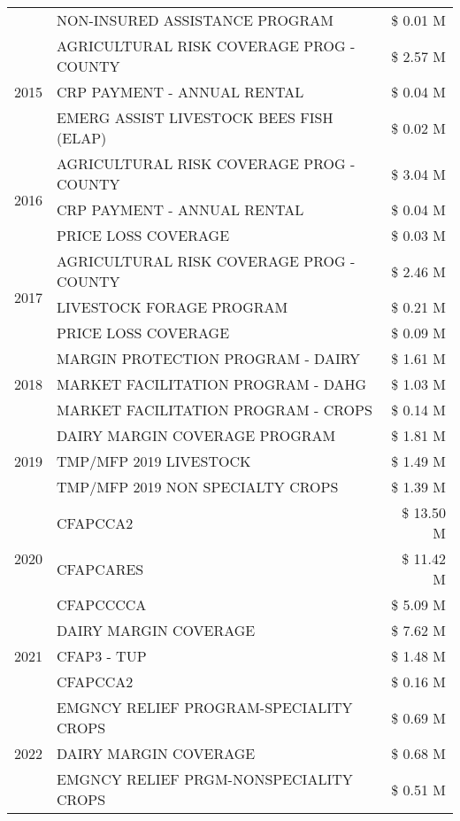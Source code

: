 \begin{tabular}{llr}
 & NON-INSURED ASSISTANCE PROGRAM & \$ 0.01 M \\
\cline{1-3}
\multirow[t]{3}{*}{2015} & AGRICULTURAL RISK COVERAGE PROG - COUNTY & \$ 2.57 M \\
 & CRP PAYMENT - ANNUAL RENTAL & \$ 0.04 M \\
 & EMERG ASSIST LIVESTOCK BEES FISH (ELAP) & \$ 0.02 M \\
\cline{1-3}
\multirow[t]{3}{*}{2016} & AGRICULTURAL RISK COVERAGE PROG - COUNTY & \$ 3.04 M \\
 & CRP PAYMENT - ANNUAL RENTAL & \$ 0.04 M \\
 & PRICE LOSS COVERAGE & \$ 0.03 M \\
\cline{1-3}
\multirow[t]{3}{*}{2017} & AGRICULTURAL RISK COVERAGE PROG - COUNTY & \$ 2.46 M \\
 & LIVESTOCK FORAGE PROGRAM & \$ 0.21 M \\
 & PRICE LOSS COVERAGE & \$ 0.09 M \\
\cline{1-3}
\multirow[t]{3}{*}{2018} & MARGIN PROTECTION PROGRAM - DAIRY & \$ 1.61 M \\
 & MARKET FACILITATION PROGRAM - DAHG & \$ 1.03 M \\
 & MARKET FACILITATION PROGRAM - CROPS & \$ 0.14 M \\
\cline{1-3}
\multirow[t]{3}{*}{2019} & DAIRY MARGIN COVERAGE PROGRAM & \$ 1.81 M \\
 & TMP/MFP 2019 LIVESTOCK & \$ 1.49 M \\
 & TMP/MFP 2019 NON SPECIALTY CROPS & \$ 1.39 M \\
\cline{1-3}
\multirow[t]{3}{*}{2020} & CFAPCCA2 & \$ 13.50 M \\
 & CFAPCARES & \$ 11.42 M \\
 & CFAPCCCCA & \$ 5.09 M \\
\cline{1-3}
\multirow[t]{3}{*}{2021} & DAIRY MARGIN COVERAGE & \$ 7.62 M \\
 & CFAP3 - TUP & \$ 1.48 M \\
 & CFAPCCA2 & \$ 0.16 M \\
\cline{1-3}
\multirow[t]{3}{*}{2022} & EMGNCY RELIEF PROGRAM-SPECIALITY CROPS & \$ 0.69 M \\
 & DAIRY MARGIN COVERAGE & \$ 0.68 M \\
 & EMGNCY RELIEF PRGM-NONSPECIALITY CROPS & \$ 0.51 M \\
\cline{1-3}
\bottomrule
\end{tabular}
